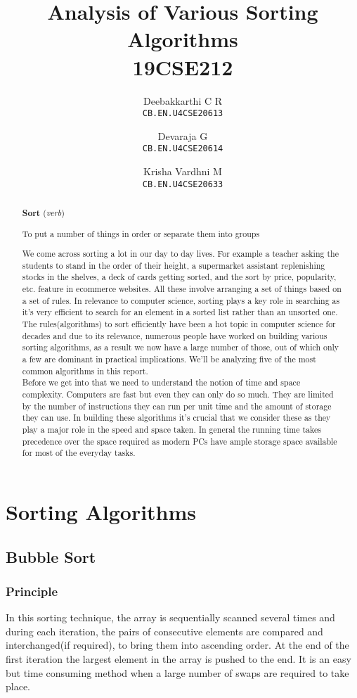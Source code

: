 \documentclass[12pt]{article}
\title{Analysis of Various Sorting Algorithms \\ 19CSE212}
\author{Deebakkarthi C R\\\color{magenta}\texttt{CB.EN.U4CSE20613}
\and
Devaraja G\\\color{magenta}\texttt{CB.EN.U4CSE20614}
\and
Krisha Vardhni M\\\color{magenta}\texttt{CB.EN.U4CSE20633}
}
\begin{document}
\begin{titlepage}
\maketitle
\end{titlepage}
\tableofcontents
\pagebreak
\begin{abstract}
	\epigraph{
		\textbf{Sort} (\textit{verb})}
	{To put a number of things in order or separate them into groups
}
	We come across sorting a lot in our day to day lives. For
	example a teacher asking the students to stand in the
	order of their height, a supermarket assistant
	replenishing stocks in the shelves, a deck of cards
	getting sorted, and the sort by price, popularity, etc.
	feature in ecommerce websites. All these involve
	arranging a set of things based on a set of rules. In
	relevance to computer science, sorting plays a key role
	in searching as it’s very efficient to search for an
	element in a sorted list rather than an unsorted one. The
	rules(algorithms) to sort efficiently have been a hot
	topic in computer science for decades and due to its
	relevance, numerous people have worked on building
	various sorting algorithms, as a result we now have a
	large number of those, out of which only a few are
	dominant in practical implications. We’ll be analyzing
	five of the most common algorithms in this report. \\


	Before we get into that we need to understand the notion of time
	and space complexity. Computers are fast but even they
	can only do so much. They are limited by the number of
	instructions they can run per unit time and the amount of
	storage they can use. In building these algorithms it's
	crucial that we consider these as they play a major role
	in the speed and space taken. In general the running time
	takes precedence over the space required as modern PCs
	have ample storage space available for most of the
	everyday tasks.
\end{abstract}
\section{Sorting Algorithms}
\subsection{Bubble Sort}
\subsubsection*{Principle}
In this sorting technique, the array is sequentially scanned
several times and during each iteration, the pairs of consecutive
elements are compared and interchanged(if required), to bring
them into ascending order. At the end of the first iteration the
largest element in the array is pushed to the end. It is an easy
but time consuming method when a large number of swaps are
required to take place.
\end{document}

